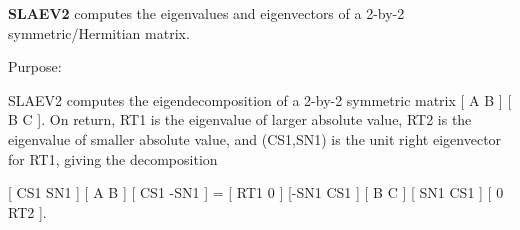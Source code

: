 {\bfseries S\+L\+A\+E\+V2} computes the eigenvalues and eigenvectors of a 2-\/by-\/2 symmetric/\+Hermitian matrix. 

 \begin{DoxyParagraph}{Purpose\+: }
\begin{DoxyVerb} SLAEV2 computes the eigendecomposition of a 2-by-2 symmetric matrix
    [  A   B  ]
    [  B   C  ].
 On return, RT1 is the eigenvalue of larger absolute value, RT2 is the
 eigenvalue of smaller absolute value, and (CS1,SN1) is the unit right
 eigenvector for RT1, giving the decomposition

    [ CS1  SN1 ] [  A   B  ] [ CS1 -SN1 ]  =  [ RT1  0  ]
    [-SN1  CS1 ] [  B   C  ] [ SN1  CS1 ]     [  0  RT2 ].\end{DoxyVerb}
 
\end{DoxyParagraph}

